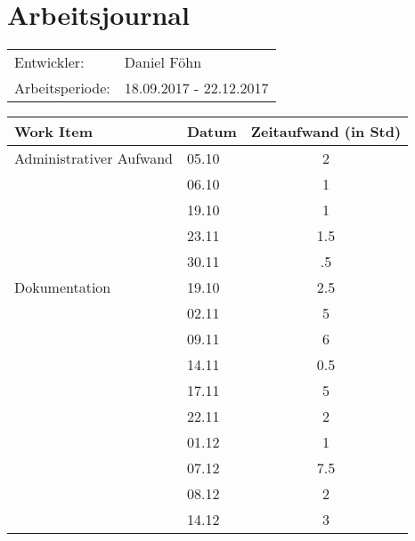 \documentclass[a4paper, 10pt, fleqn]{article}
\newcommand{\header}{\textbf{Work Item}&\textbf{Datum}&\textbf{Zeitaufwand (in Std)}\\\toprule}
\begin{document}
	\section*{Arbeitsjournal}
    \begin{tabular}{ll}
        Entwickler: & Daniel Föhn \\
        Arbeitsperiode: & 18.09.2017 - 22.12.2017\\
    \end{tabular}
	\begin{longtable}{p{9cm}|p{2cm}|c}
        \header

        Administrativer Aufwand & 05.10 & 2\\
        & 06.10 & 1\\
        & 19.10 & 1\\
        & 23.11 & 1.5\\
        & 30.11 & .5\\
        
        Dokumentation & 19.10 & 2.5\\
        & 02.11 & 5\\
        & 09.11 & 6\\
        & 14.11 & 0.5\\
        & 17.11 & 5\\
        & 22.11 & 2\\
        & 01.12 & 1\\
        & 07.12 & 7.5\\
        & 08.12 & 2\\
        & 14.12 & 3\\
        

\end{longtable}
\end{document}
